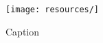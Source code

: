 \begin{figure}
    \centering
    \texttt{[image: resources/]}
    \caption{Caption}
    \label{fig:my_label}
\end{figure}